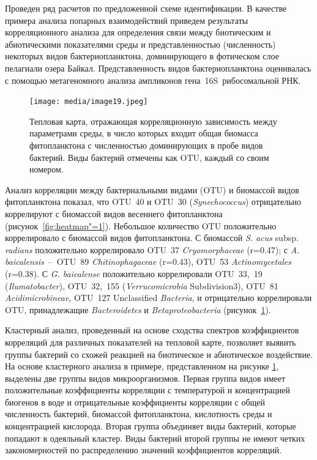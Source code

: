 \documentclass[a4paper,12pt,openany,final]{extreport}
\def\oldcaption{} \let\oldcaption=\caption
\def\caption{\stepcounter{captionsnum}\oldcaption}
\begin{document}
Проведен ряд расчетов по предложенной схеме идентификации. В качестве примера анализа попарных взаимодействий приведем результаты корреляционного анализа для определения связи между биотическим и абиотическими показателями среды и представленностью (численность) некоторых видов бактериопланктона, доминирующего в фотическом слое пелагиали озера Байкал. Представленность видов бактериопланктона оценивалась с помощью метагеномного анализа ампликонов гена~16S~рибосомальной РНК.

\begin{figure}\centering

\texttt{[image: media/image19.jpeg]}
\caption{Тепловая карта, отражающая корреляционную зависимость между параметрами среды, в число которых входит общая биомасса фитопланктона с численностью доминирующих в пробе видов бактерий. Виды бактерий отмечены как OTU, каждый со своим номером.}\label{fig:heatmap-1}
\end{figure}

Анализ корреляции между бактериальными видами (OTU) и биомассой видов фитопланктона показал, что OTU~40 и OTU~30 (\emph{Synechococcus}) отрицательно коррелируют с биомассой видов весеннего фитопланктона (рисунок~\ref{fig:heatmap"=1}). Небольшое количество OTU положительно коррелировало с биомассой видов фитопланктона. С биомассой \emph{S. acus} subsp. \emph{radians} положительно коррелировало OTU~37 \emph{Cryomorphaceae} (r=0.47); с \emph{A. baicalensis}~--~OTU~89 \emph{Chitinophagaceae} (r=0.43), OTU~53 \emph{Actinomycetales} (r=0.38). С \emph{G. baicalense} положительно коррелировали OTU~33,~19 (\emph{Ilumatobacter}), OTU~32,~155 (\emph{Verrucomicrobia} Subdivision3), OTU~81 \emph{Acidimicrobineae}, OTU~127 Unclassified \emph{Bacteria}, и отрицательно коррелировали OTU, принадлежащие \emph{Bacteroidetes} и \emph{Betaproteobacteria} (рисунок~\ref{fig:heatmap-1}).

Кластерный анализ, проведенный на основе сходства спектров коэффициентов корреляций для различных показателей на тепловой карте, позволяет выявить группы бактерий со схожей реакцией на биотическое и абиотическое воздействие. На основе кластерного анализа в примере, представленном на рисунке \ref{fig:heatmap-1}, выделены две группы видов микроорганизмов. Первая группа видов имеет положительные коэффициенты корреляции с температурой и концентрацией биогенов в воде и отрицательные коэффициенты корреляции с общей численность бактерий, биомассой фитопланктона, кислотность среды и концентрацией кислорода. Вторая группа объединяет виды бактерий, которые попадают в одеяльный кластер. Виды бактерий второй группы не имеют четких закономерностей по распределению значений коэффициентов корреляций.
\end{document}
